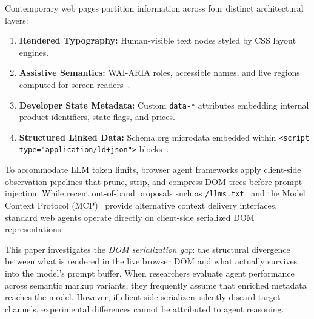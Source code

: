 \documentclass[conference]{IEEEtran}
\begin{document}
Contemporary web pages partition information across four distinct architectural layers:
\begin{enumerate}
    \item \textbf{Rendered Typography:} Human-visible text nodes styled by CSS layout engines.
    \item \textbf{Assistive Semantics:} WAI-ARIA roles, accessible names, and live regions computed for screen readers~\cite{wai_aria12, accname11}.
    \item \textbf{Developer State Metadata:} Custom \texttt{data-*} attributes embedding internal product identifiers, state flags, and prices.
    \item \textbf{Structured Linked Data:} Schema.org microdata embedded within \texttt{<script type="application/ld+json">} blocks~\cite{schemaorg}.
\end{enumerate}

To accommodate LLM token limits, browser agent frameworks apply client-side observation pipelines that prune, strip, and compress DOM trees before prompt injection. While recent out-of-band proposals such as \texttt{/llms.txt}~\cite{llmstxt2024} and the Model Context Protocol (MCP)~\cite{mcp2024} provide alternative context delivery interfaces, standard web agents operate directly on client-side serialized DOM representations.

This paper investigates the \emph{DOM serialization gap}: the structural divergence between what is rendered in the live browser DOM and what actually survives into the model's prompt buffer. When researchers evaluate agent performance across semantic markup variants, they frequently assume that enriched metadata reaches the model. However, if client-side serializers silently discard target channels, experimental differences cannot be attributed to agent reasoning.
\end{document}
